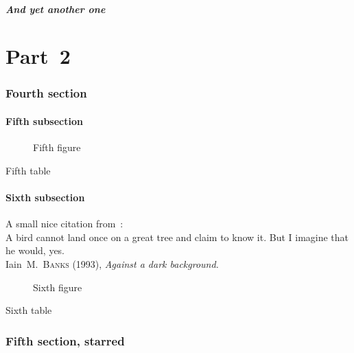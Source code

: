 \documentclass[oneside,12pt,a4paper]{article}
\begin{document}
\subsubsection{And yet another one}

\part{Part~2}
\parttoc \mtcskip \partlof \mtcskip \partlot

\section{Fourth section}
\secttoc \mtcskip \sectlof \mtcskip \sectlot
\subsection{Fifth subsection}

\begin{figure}[tp] \caption{Fifth figure} \end{figure}
\begin{table}[tp] \caption{Fifth table} \end{table}

\subsection{Sixth subsection}
A small nice citation from~\cite{dark}:\\
%
%
%
%
%
%
A bird cannot land once on a great tree and claim to know it.
But I imagine that he would, yes.\\
\hbox{}\hfill
Iain~M.~\textsc{Banks} (1993), \textsl{Against a dark background.}%

\begin{figure}[tp] \caption{Sixth figure} \end{figure}
\begin{table} \caption{Sixth table} \end{table}

\section*{Fifth section, starred}
\end{document}
